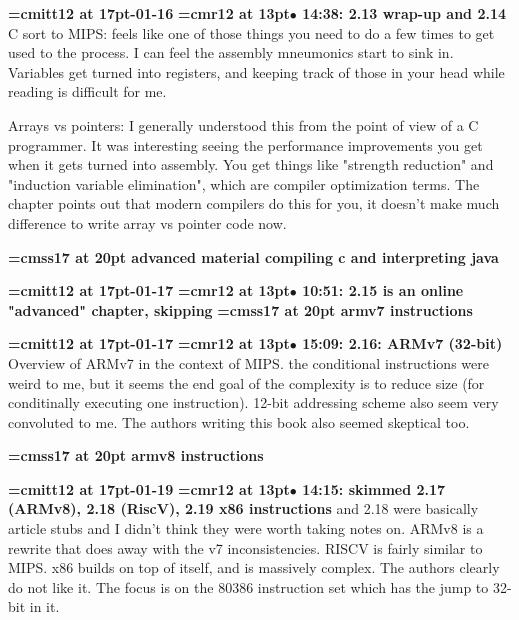 {\medskip\noindent\bf\font\titlefont=cmitt12 at 17pt-01-16}\medskip
{\smallskip\noindent\bf\font\titlefont=cmr12 at 13pt\titlefont $\bullet$ 14:38: 2.13 wrap-up and 2.14}\smallskip
C sort to MIPS: feels like one of those things you need to do a few times to get used to the process. I can feel the assembly mneumonics start to sink in. Variables get turned into registers, and keeping track of those in your head while reading is difficult for me.
\par

Arrays vs pointers: I generally understood this from the point of view of a C programmer. It was interesting seeing the performance improvements you get when it gets turned into assembly. You get things like "strength reduction" and "induction variable elimination", which are compiler optimization terms. The chapter points out that modern compilers do this for you, it doesn't make much difference to write array vs pointer code now.
\par

{\medskip\noindent\bf\font\titlefont=cmss17 at 20pt advanced material compiling c and interpreting java}\medskip

{\medskip\noindent\bf\font\titlefont=cmitt12 at 17pt-01-17}\medskip
{\smallskip\noindent\bf\font\titlefont=cmr12 at 13pt\titlefont $\bullet$ 10:51: 2.15 is an online "advanced" chapter, skipping}\smallskip
{}
{\medskip\noindent\bf\font\titlefont=cmss17 at 20pt armv7 instructions}\medskip

{\medskip\noindent\bf\font\titlefont=cmitt12 at 17pt-01-17}\medskip
{\smallskip\noindent\bf\font\titlefont=cmr12 at 13pt\titlefont $\bullet$ 15:09: 2.16: ARMv7 (32-bit)}\smallskip
Overview of ARMv7 in the context of MIPS. the conditional instructions were weird to me, but it seems the end goal of the complexity is to reduce size (for conditinally executing one instruction). 12-bit addressing scheme also seem very convoluted to me. The authors writing this book also seemed skeptical too.
\par

{\medskip\noindent\bf\font\titlefont=cmss17 at 20pt armv8 instructions}\medskip

{\medskip\noindent\bf\font\titlefont=cmitt12 at 17pt-01-19}\medskip
{\smallskip\noindent\bf\font\titlefont=cmr12 at 13pt\titlefont $\bullet$ 14:15: skimmed 2.17 (ARMv8), 2.18 (RiscV), 2.19 x86 instructions} and 2.18 were basically article stubs and I didn't think they were worth taking notes on. ARMv8 is a rewrite that does away with the v7 inconsistencies. RISCV is fairly similar to MIPS. x86 builds on top of itself, and is massively complex. The authors clearly do not like it. The focus is on the 80386 instruction set which has the jump to 32-bit in it.
\par

